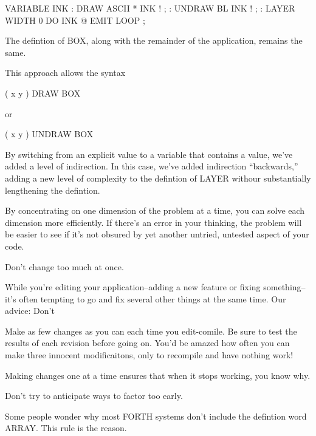 \begin{Code}
VARIABLE INK
: DRAW   ASCII *  INK ! ;
: UNDRAW   BL  INK ! ;
: LAYER   WIDTH  0 DO  INK @  EMIT  LOOP ;
\end{Code}
The defintion of BOX, along with the remainder of the application, remains the same.

This approach allows the syntax

\begin{Code}
( x y ) DRAW BOX
\end{Code}
or

\begin{Code}
( x y ) UNDRAW BOX
\end{Code}
By switching from an explicit value to a variable that contains a value, we've added a level of indirection. In this case, we've added indirection ``backwards,'' adding a new level of complexity to the defintion of LAYER withour substantially lengthening the defintion.

By concentrating on one dimension of the problem at a time, you can solve each dimension more efficiently. If there's an error in your thinking, the problem will be easier to see if it's not obsured by yet another untried, untested aspect of your code.

\begin{tip}
Don't change too much at once.
\end{tip}
While you're editing your application--adding a new feature or fixing something--it's often tempting to go and fix several other things at the same time. Our advice: Don't

Make as few changes as you can each time you edit-comile. Be sure to test the results of each revision before going on. You'd be amazed how often you can make three innocent modificaitons, only to recompile and have nothing work!

Making changes one at a time ensures that when it stops working, you know why.

\begin{tip}
Don't try to anticipate ways to factor too early.
\end{tip}
Some people wonder why most FORTH systems don't include the defintion word ARRAY. This rule is the reason.

